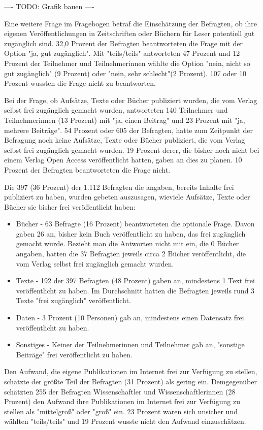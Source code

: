 ---- TODO: Grafik bauen ----

Eine weitere Frage im Fragebogen betraf die Einschätzung der Befragten, ob ihre eigenen Veröffentlichungen in Zeitschriften oder Büchern für Leser potentiell gut zugänglich sind. 32,0 Prozent der Befragten beantworteten die Frage mit der Option "ja, gut zugänglich". Mit "teils/teils" antworteten 47 Prozent und 12 Prozent der Teilnehmer und Teilnehmerinnen wählte die Option "nein, nicht so gut zugänglich" (9 Prozent) oder "nein, sehr schlecht"(2 Prozent). 107 oder 10 Prozent wussten die Frage nicht zu beantworten.

Bei der Frage, ob Aufsätze, Texte oder Bücher publiziert wurden, die vom Verlag selbst frei zugänglich gemacht wurden, antworteten 140 Teilnehmer und Teilnehmerinnen (13 Prozent) mit "ja, einen Beitrag" und 23 Prozent mit "ja, mehrere Beiträge". 54 Prozent oder 605 der Befragten, hatte zum Zeitpunkt der Befragung noch keine Aufsätze, Texte oder Bücher publiziert, die vom Verlag selbst frei zugänglich gemacht wurden.  19 Prozent derer, die bisher noch nicht bei einem Verlag Open Access veröffentlicht hatten, gaben an dies zu planen. 10 Prozent der Befragten beantworteten die Frage nicht.

Die 397 (36 Prozent) der 1.112 Befragten die angaben, bereits Inhalte frei publiziert zu haben, wurden gebeten auszusagen, wieviele Aufsätze, Texte oder Bücher sie bisher frei veröffentlicht haben:
\begin{itemize}
\item Bücher - 63 Befragte (16 Prozent) beantworteten die optionale Frage. Davon gaben 26 an, bisher kein Buch veröffentlicht zu haben, das frei zugänglich gemacht wurde. Bezieht man die Antworten nicht mit ein, die 0 Bücher angaben, hatten die 37 Befragten jeweils circa 2 Bücher veröffentlicht, die vom Verlag selbst frei zugänglich gemacht wurden.
\item Texte - 192 der 397 Befragten (48 Prozent) gaben an, mindestens 1 Text frei veröffentlicht zu haben. Im Durchschnitt hatten die Befragten jeweils rund 3 Texte "frei zugänglich" veröffentlicht.
\item Daten - 3 Prozent (10 Personen) gab an, mindestens einen Datensatz frei veröffentlicht zu haben.
\item Sonstiges - Keiner der Teilnehmerinnen und Teilnehmer gab an, "sonstige Beiträge" frei veröffentlicht zu haben.
\end{itemize}

Den Aufwand, die eigene Publikationen im Internet frei zur Verfügung zu stellen, schätzte der größte Teil der Befragten (31 Prozent) als gering ein. Demgegenüber schätzten 255 der Befragten Wissenschaftler und Wissenschaftlerinnen (28 Prozent) den Aufwand ihre Publikationen im Internet frei zur Verfügung zu stellen als "mittelgroß" oder "groß" ein. 23 Prozent waren sich unsicher und wählten "teils/teils" und 19 Prozent wusste nicht den Aufwand einzuschätzen.


